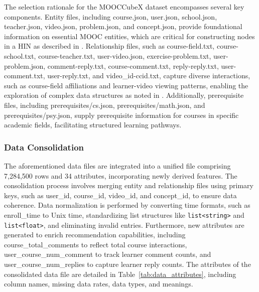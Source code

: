 \documentclass{ieeeaccess}
\begin{document}
The selection rationale for the MOOCCubeX dataset encompasses several key components. Entity files, including course.json, user.json, school.json, teacher.json, video.json, problem.json, and concept.json, provide foundational information on essential MOOC entities, which are critical for constructing nodes in a HIN as described in \cite{shi2018heterogeneous}. 
Relationship files, such as course-field.txt, course-school.txt, course-teacher.txt, user-video.json, exercise-problem.txt, user-problem.json, comment-reply.txt, course-comment.txt, reply-reply.txt, user-comment.txt, user-reply.txt, and video\_id-ccid.txt, capture diverse interactions, such as course-field affiliations and learner-video viewing patterns, enabling the exploration of complex data structures as noted in \cite{yu2021mooccubex}. 
Additionally, prerequisite files, including prerequisites/cs.json, prerequisites/math.json, and prerequisites/psy.json, supply prerequisite information for courses in specific academic fields, facilitating structured learning pathways.

\subsubsection{Data Consolidation}

The aforementioned data files are integrated into a unified file comprising 7,284,500 rows and 34 attributes, incorporating newly derived features. The consolidation process involves merging entity and relationship files using primary keys, such as user\_id, course\_id, video\_id, and concept\_id, to ensure data coherence. Data normalization is performed by converting time formats, such as enroll\_time to Unix time, standardizing list structures like \texttt{list<string>} and \texttt{list<float>}, and eliminating invalid entries. Furthermore, new attributes are generated to enrich recommendation capabilities, including course\_total\_comments to reflect total course interactions, user\_course\_num\_comment to track learner comment counts, and user\_course\_num\_replies to capture learner reply counts.
The attributes of the consolidated data file are detailed in Table~\ref{tab:data_attributes}, including column names, missing data rates, data types, and meanings.
\end{document}
